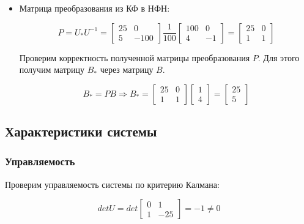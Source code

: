 \documentclass[14pt,a4paper,report]{report}
\begin{document}
\begin{itemize}
	\item Матрица преобразования из КФ в НФН:
	
	\begin{equation*}
	\text{$P=U_{*}U^{-1}=\begin{bmatrix} 25 & 0 \\ 5 & -100 \end{bmatrix}\frac{1}{100}\begin{bmatrix} 100 & 0 \\ 4 & -1 \end{bmatrix}=\begin{bmatrix} 25 & 0 \\ 1 & 1 \end{bmatrix}$}
	\end{equation*}
	
	Проверим корректность полученной матрицы преобразования $P$. Для этого получим матрицу $B_{*}$ через матрицу $B$.
	
	\begin{equation*}
	\text{$B_{*}=PB$}
	\Longrightarrow
	\text{$B_{*}=\begin{bmatrix} 25 & 0 \\ 1 & 1 \end{bmatrix}\begin{bmatrix} 1 \\ 4 \end{bmatrix}=\begin{bmatrix} 25 \\ 5 \end{bmatrix}$}
	\end{equation*}
		
\end{itemize}

\subsection{Характеристики системы}

\subsubsection{Управляемость}

Проверим управляемость системы по критерию Калмана:

\begin{equation*}
\text{$detU=det\begin{bmatrix} 0 & 1 \\ 1 & -25 \end{bmatrix}=-1\neq 0$}
\end{equation*}
\end{document}
